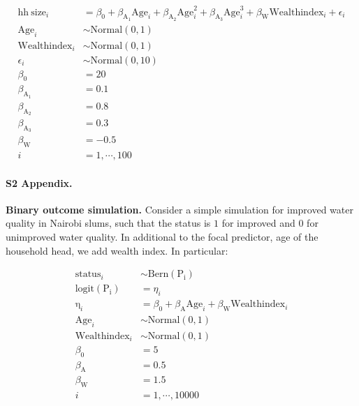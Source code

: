 \begin{align}\label{sim:lm_cubic}
\mathrm{hh~size}_i &= \beta_0 + \beta_{\mathrm{A_1}}\mathrm{Age}_i + \beta_{\mathrm{A_2}}\mathrm{Age}^2_i + \beta_{\mathrm{A_3}}\mathrm{Age}^3_i + \beta_{\mathrm{W}}\mathrm{Wealthindex}_i + \epsilon_i \nonumber\\
\mathrm{Age}_i &\sim \mathrm{Normal}(0, 1) \nonumber\\
\mathrm{Wealthindex}_i &\sim \mathrm{Normal}(0, 1) \nonumber\\
\epsilon_i &\sim \mathrm{Normal}(0, 10) \nonumber\\
\beta_0 &= 20 \nonumber\\
\beta_{\mathrm{A}_1} &= 0.1 \nonumber\\
\beta_{\mathrm{A}_2} &= 0.8 \nonumber\\
\beta_{\mathrm{A}_3} &= 0.3 \nonumber\\
\beta_{\mathrm{W}} &= -0.5 \nonumber\\
i &= 1,\cdots, 100
\end{align}


\paragraph*{S2 Appendix.}
\label{S2_Appendix}
{\bf Binary outcome simulation.} Consider a simple simulation for improved water quality in Nairobi slums, such that the status is $1$ for improved and $0$ for unimproved water quality. In additional to the focal predictor, age of the household head, we add wealth index. In particular:

\begin{align}\label{sim:glm_two_pred}
\mathrm{status}_i &\sim \mathrm{Bern}(\mathrm{P_i}) \nonumber\\
\mathrm{logit}(\mathrm{P_i}) &= \eta_i \nonumber\\
\mathrm{\eta}_i &= \beta_0 + \beta_{\mathrm{A}}\mathrm{Age}_i + \beta_{\mathrm{W}}\mathrm{Wealthindex}_i \nonumber\\
\mathrm{Age}_i &\sim \mathrm{Normal}(0, 1) \nonumber\\
\mathrm{Wealthindex}_i &\sim \mathrm{Normal}(0, 1) \nonumber\\
\beta_0 &= 5 \nonumber\\
\beta_{\mathrm{A}} &= 0.5 \nonumber\\
\beta_{\mathrm{W}} &= 1.5 \nonumber\\
i &= 1,\cdots, 10000
\end{align}

